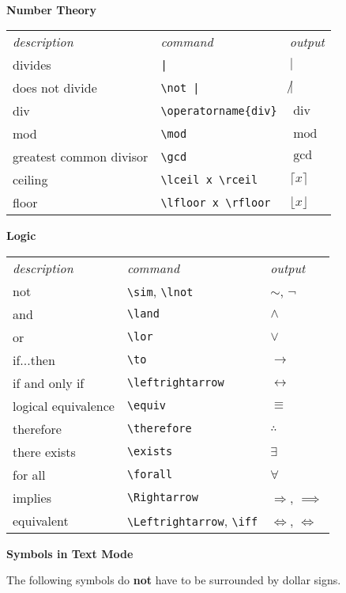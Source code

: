 \documentclass[10pt,landscape]{article}
\newcommand{\ColorSection}[1]{\par\vspace{1.5ex}\noindent\textcolor{sectioncolor}{\Large\bfseries #1}\par\vspace{0.75ex}}
\newcommand{\ColorSubsection}[1]{\par\vspace{1ex}\noindent\textcolor{subsectioncolor}{\normalsize\bfseries #1}\par\vspace{0.5ex}}
\begin{document}
\begin{multicols}{3}
\vfill
~
\columnbreak
\ColorSubsection{Number Theory}
\begin{tabular}{lll}
\emph{description} & \emph{command} & \emph{output}\\
divides & \verb!|! & $|$\\
does not divide & \verb!\not |! & $\not |$\\
div & \verb!\operatorname{div}! & $\operatorname{div}$\\
mod & \verb!\mod! & $\operatorname{mod}$\\
greatest common divisor & \verb!\gcd! & $\gcd$\\
ceiling & \verb!\lceil x \rceil! & $\lceil x\rceil$\\
floor & \verb!\lfloor x \rfloor! & $\lfloor x \rfloor$\\
\end{tabular}



\ColorSubsection{Logic}
\begin{tabular}{lll}
\emph{description} & \emph{command} & \emph{output}\\
not & \verb!\sim!, \verb!\lnot!& $\sim$, $\lnot$\\
and & \verb!\land! & $\land$\\
or & \verb!\lor! & $\lor$\\
if...then & \verb!\to! & $\to$\\
if and only if & \verb!\leftrightarrow! & $\leftrightarrow$\\
logical equivalence & \verb!\equiv! & $\equiv$\\
therefore & \verb!\therefore! & $\therefore$\\
there exists  & \verb!\exists! & $\exists$\\
for all & \verb!\forall! & $\forall$\\
implies & \verb!\Rightarrow! & $\Rightarrow$, $\implies$\\
equivalent & \verb!\Leftrightarrow!, \verb!\iff! & $\Leftrightarrow$, $\iff$
\end{tabular}


\ColorSection{Symbols in Text Mode}

The following symbols do \textbf{not} have to be surrounded by dollar signs.


\end{multicols}
\end{document}
